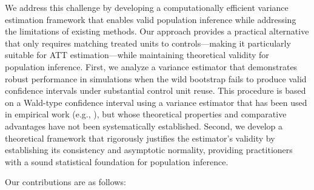 \documentclass{mytemplate}
\begin{document}
We address this challenge by developing a computationally efficient variance estimation framework that enables valid population inference while addressing the limitations of existing methods. Our approach provides a practical alternative that only requires matching treated units to controls—making it particularly suitable for ATT estimation—while maintaining theoretical validity for population inference. First, we analyze a variance estimator that demonstrates robust performance in simulations when the wild bootstrap fails to produce valid confidence intervals under substantial control unit reuse. This procedure is based on a Wald-type confidence interval using a variance estimator that has been used in empirical work (e.g., \cite{che2024caliper, keele_hospital_2023}), but whose theoretical properties and comparative advantages have not been systematically established. Second, we develop a theoretical framework that rigorously justifies the estimator's validity by establishing its consistency and asymptotic normality, providing practitioners with a sound statistical foundation for population inference.

Our contributions are as follows:
\end{document}
